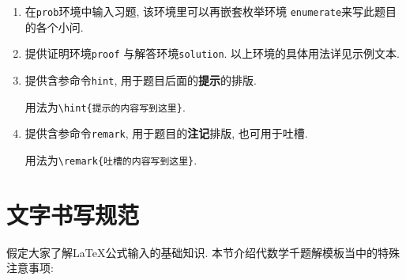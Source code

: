 \documentclass[oneside,a4papar,11pt,UTF8]{book}
\begin{document}
\begin{enumerate}
\begin{enumerate}
    \item 在\verb"prob"环境中输入习题,
    该环境里可以再嵌套枚举环境
    \verb"enumerate"来写此题目的各个小问.
    
    \item 提供证明环境\verb"proof"
    与解答环境\verb"solution".
    以上环境的具体用法详见示例文本.
    
    \item 提供含参命令\verb"hint",
    用于题目后面的\textbf{提示}的排版.
    
    用法为\verb"\hint{提示的内容写到这里}".
    
    \item 提供含参命令\verb"remark",
    用于题目的\textbf{注记}排版,
    也可用于吐槽.

    用法为\verb"\remark{吐槽的内容写到这里}".
  \end{enumerate}
\end{enumerate}

\section{文字书写规范}

假定大家了解\LaTeX 公式输入的基础知识.
本节介绍代数学千题解模板当中的特殊注意事项:
\end{document}
